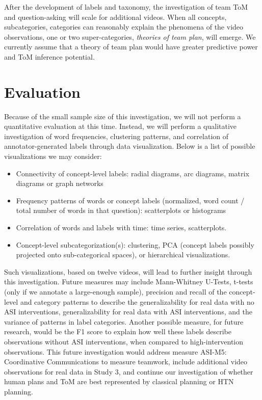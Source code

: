 After the development of labels and taxonomy, the investigation of team ToM and
question-asking will scale for additional videos. When all concepts,
subcategories, categories can reasonably explain the phenomena of the video
observations, one or two super-categories, \emph{theories of team plan}, will
emerge. We currently assume that a theory of team plan would have greater
predictive power and ToM inference potential. 


\section{Evaluation}

Because of the small sample size of this investigation, we will not perform a
quantitative evaluation at this time. Instead, we will perform a qualitative
investigation of word frequencies, clustering patterns, and correlation of
annotator-generated labels through data visualization. Below is a list of
possible visualizations we may consider:

\begin{itemize}

    \item Connectivity of concept-level labels: radial diagrams, arc diagrams,
        matrix diagrams or graph networks

    \item Frequency patterns of words or concept labels (normalized, word count
        / total number of words in that question): scatterplots or histograms

    \item Correlation of words and labels with time: time series, scatterplots. 

    \item Concept-level subcategorization(s): clustering, PCA (concept labels
        possibly projected onto sub-categorical spaces), or hierarchical
        visualizations.

\end{itemize}


Such visualizations, based on twelve videos, will lead to further insight
through this investigation. Future measures may include Mann-Whitney U-Tests,
t-tests (only if we annotate a large-enough sample), precision and recall of
the concept-level and category patterns to describe the generalizability for
real data with no ASI interventions, generalizability for real data with ASI
interventions, and the variance of patterns in label categories. Another
possible measure, for future research, would be the F1 score to explain how
well these labels describe observations without ASI interventions, when
compared to high-intervention observations. This future investigation would
address measure ASI-M5: Coordinative Communications to
measure teamwork, include additional video observations for real data in Study
3, and continue our investigation of whether human plans and ToM are best
represented by classical planning or HTN planning.



